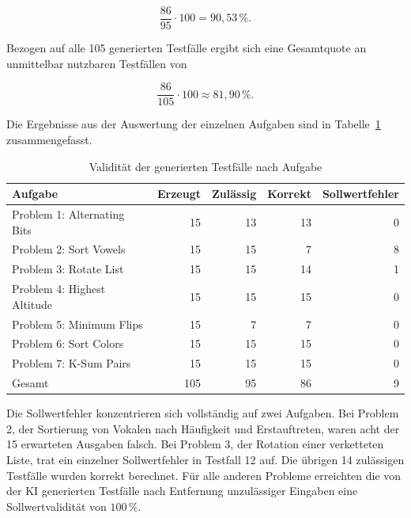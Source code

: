 \[
\frac{86}{95} \cdot 100 = 90{,}53\,\%.
\]

Bezogen auf alle 105 generierten Testfälle ergibt sich eine
Gesamtquote an unmittelbar nutzbaren Testfällen von

\[
\frac{86}{105} \cdot 100 \approx 81{,}90\,\%.
\]

Die Ergebnisse aus der Auswertung der einzelnen Aufgaben sind in
Tabelle~\ref{tab:validitaet-probleme} zusammengefasst.

\begin{table}[htbp]
    \centering
    \renewcommand{\arraystretch}{1.15}
    \caption{Validität der generierten Testfälle nach Aufgabe}
    \label{tab:validitaet-probleme}
    \begin{tabular}{l r r r r}
        \hline
        Aufgabe & Erzeugt & Zulässig & Korrekt & Sollwertfehler \\
        \hline
        Problem 1: Alternating Bits & 15 & 13 & 13 & 0 \\
        Problem 2: Sort Vowels & 15 & 15 & 7  & 8 \\
        Problem 3: Rotate List & 15 & 15 & 14 & 1 \\
        Problem 4: Highest Altitude & 15 & 15 & 15 & 0 \\
        Problem 5: Minimum Flips & 15 & 7  & 7  & 0 \\
        Problem 6: Sort Colors & 15 & 15 & 15 & 0 \\
        Problem 7: K-Sum Pairs & 15 & 15 & 15 & 0 \\
        \hline
        Gesamt    & 105 & 95 & 86 & 9 \\
        \hline
    \end{tabular}
\end{table}

Die Sollwertfehler konzentrieren sich vollständig auf zwei Aufgaben. Bei
Problem 2, der Sortierung von Vokalen nach Häufigkeit und Erstauftreten,
waren acht der 15 erwarteten Ausgaben falsch. Bei Problem 3, der Rotation einer verketteten Liste, trat ein einzelner
Sollwertfehler in Testfall 12 auf. Die übrigen 14 zulässigen Testfälle
wurden korrekt berechnet. Für alle anderen Probleme erreichten die von der \ac{KI} generierten Testfälle nach Entfernung
unzulässiger Eingaben eine Sollwertvalidität von \(100\,\%\).

